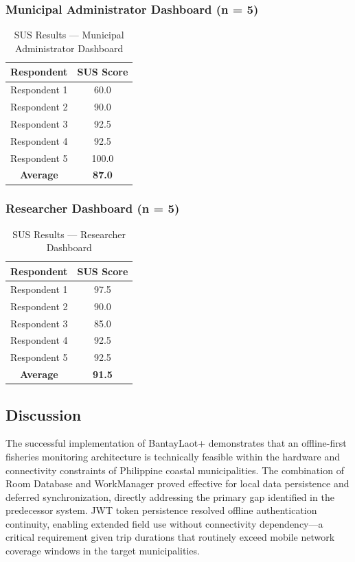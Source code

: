 \documentclass{icsthesis}
\begin{document}
\begin{mainmatter}
\subsubsection{Municipal Administrator Dashboard (n = 5)}

\begin{table}[h]
\centering
\caption{SUS Results --- Municipal Administrator Dashboard}
\label{tab:sus_municipal}
\begin{tabular}{@{}cc@{}}
\hline
\hline
\toprule
\textbf{Respondent} & \textbf{SUS Score} \\
\midrule
\hline
Respondent 1 & 60.0 \\
Respondent 2 & 90.0 \\
Respondent 3 & 92.5 \\
Respondent 4 & 92.5 \\
Respondent 5 & 100.0 \\ \hline
\midrule
\textbf{Average} & \textbf{87.0} \\
\bottomrule
\hline
\hline
\end{tabular}
\end{table}

\subsubsection{Researcher Dashboard (n = 5)}

\begin{table}[h]
\centering
\caption{SUS Results --- Researcher Dashboard}
\label{tab:sus_researcher}
\begin{tabular}{@{}cc@{}}
\hline
\hline
\toprule
\textbf{Respondent} & \textbf{SUS Score} \\
\midrule
\hline
Respondent 1 & 97.5 \\ 
Respondent 2 & 90.0 \\
Respondent 3 & 85.0 \\
Respondent 4 & 92.5 \\
Respondent 5 & 92.5 \\ \hline
\midrule
\textbf{Average} & \textbf{91.5} \\
\bottomrule
\hline
\hline
\end{tabular}
\end{table}

\subsection{Discussion}

The successful implementation of BantayLaot+ demonstrates that an offline-first fisheries
monitoring architecture is technically feasible within the hardware and connectivity
constraints of Philippine coastal municipalities. The combination of Room Database and
WorkManager proved effective for local data persistence and deferred synchronization,
directly addressing the primary gap identified in the predecessor system. JWT token
persistence resolved offline authentication continuity, enabling extended field use
without connectivity dependency---a critical requirement given trip durations that
routinely exceed mobile network coverage windows in the target municipalities.


\end{mainmatter}
\end{document}
